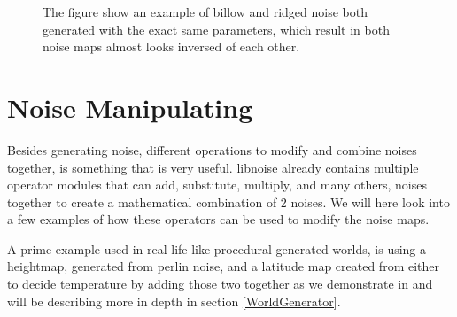 \begin{figure}[H]
\begin{minipage}[b]{.49\linewidth}
		\label{fig:4b}
	\end{minipage}
	\centering
	\caption{The figure show an example of billow and ridged noise both generated with the exact same parameters, which result in both noise maps almost looks inversed of each other.}
	\label{fig:BillowRidged}
\end{figure}


\section{Noise Manipulating}
\label{NoiseManipulating}
Besides generating noise, different operations to modify and combine noises together, is something that is very useful. libnoise already contains multiple operator modules that can add, substitute, multiply, and many others, noises together to create a mathematical combination of 2 noises. We will here look into a few examples of how these operators can be used to modify the noise maps.

A prime example used in real life like procedural generated worlds, is using a heightmap, generated from perlin noise, and a latitude map created from either to decide temperature by adding those two together as we demonstrate in  and will be describing more in depth in section \ref{WorldGenerator}.

